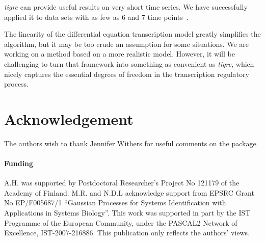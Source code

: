 \documentclass{bioinfo}
\newcommand{\tigre}{\emph{tigre}}
\begin{document}
\tigre{} can provide useful results on very short time series.  We
have successfully applied it to data sets with as few as 6 and 7 time
points~\citep{Honkela2010PNAS,Honkela2010MLSP}.

The linearity of the differential equation transcription model greatly
simplifies the algorithm, but it may be too crude an assumption for some
situations.  We are working on a method based on a more realistic
model.  However, it will be challenging to turn that framework into
something as convenient as \tigre{}, which nicely captures the
essential degrees of freedom in the transcription regulatory process.

\section*{Acknowledgement}

The authors wish to thank Jennifer Withers for useful comments on the
package.

\paragraph{Funding\textcolon}
A.H. was supported by Postdoctoral Researcher's Project No 121179 of the Academy of Finland.
M.R. and N.D.L acknowledge support from EPSRC Grant No EP/F005687/1 ``Gaussian Processes for Systems Identification with Applications in Systems Biology''. 
This work was supported in part by the IST Programme of the European Community, under the PASCAL2 Network of Excellence, IST-2007-216886. This publication only reflects the authors' views.

\small



\end{document}
